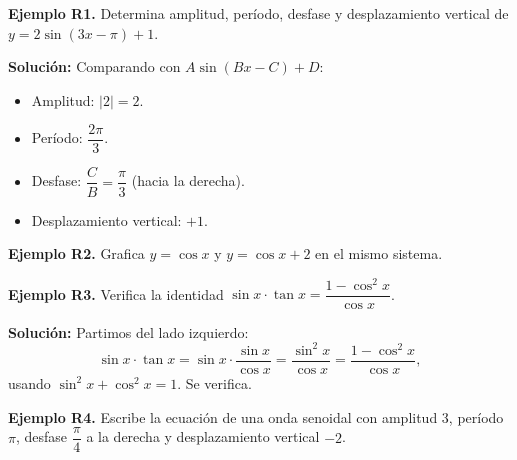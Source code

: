 \documentclass[12pt, a4paper]{article}
\begin{document}
  \textbf{Ejemplo R1.} Determina amplitud, período, desfase y desplazamiento vertical de $y = 2\sin(3x - \pi) + 1$.

  \begin{cuadrosolucion}
    \textbf{Solución:} Comparando con $A\sin(Bx - C) + D$:
    \begin{itemize}
      \item Amplitud: $|2| = 2$.
      \item Período: $\dfrac{2\pi}{3}$.
      \item Desfase: $\dfrac{C}{B} = \dfrac{\pi}{3}$ (hacia la derecha).
      \item Desplazamiento vertical: $+1$.
    \end{itemize}
  \end{cuadrosolucion}

  \textbf{Ejemplo R2.} Grafica $y = \cos x$ y $y = \cos x + 2$ en el mismo sistema.

  \begin{cuadrosolucion}
    \begin{center}
    \end{center}
  \end{cuadrosolucion}

  \textbf{Ejemplo R3.} Verifica la identidad $\sin x \cdot \tan x = \dfrac{1 - \cos^2 x}{\cos x}$.

  \begin{cuadrosolucion}
    \textbf{Solución:} Partimos del lado izquierdo:
    $$\sin x \cdot \tan x = \sin x \cdot \frac{\sin x}{\cos x} = \frac{\sin^2 x}{\cos x} = \frac{1 - \cos^2 x}{\cos x},$$
    usando $\sin^2 x + \cos^2 x = 1$. Se verifica.
  \end{cuadrosolucion}

  \textbf{Ejemplo R4.} Escribe la ecuación de una onda senoidal con amplitud 3, período $\pi$, desfase $\dfrac{\pi}{4}$ a la derecha y desplazamiento vertical $-2$.
\end{document}
